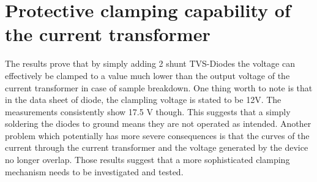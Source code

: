 \section{Protective clamping capability of the current transformer}
The results prove that by simply adding 2 shunt TVS-Diodes the voltage can effectively be clamped to a value much lower
than the output voltage of the current transformer in case of sample breakdown.
One thing worth to note is that in the data sheet of diode, the clampling voltage is stated to be 12V. The measurements consistently show 17.5 V though.
This suggests that a simply soldering the diodes to ground means they are not operated as intended.
\newline
Another problem which potentially has more severe consequences is that the curves of the current through
the current transformer and the voltage generated by the device no longer overlap.
Those results suggest that a more sophisticated clamping mechanism needs to be investigated and tested.


